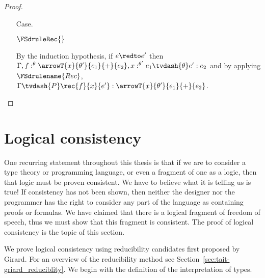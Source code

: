 \begin{proof}
\begin{itemize}
  \item[Case.]\ \\
    \begin{center}
      $\FSdruleRec{}$
    \end{center}
    By the induction hypothesis, if $e \redto e'$ then 
    $\Gamma, f:^\theta \arrowT{x}{\theta'}{e_1}{+}{e_2},x:^{\theta'} e_1 \tvdash{\theta} e':e_2$ 
    and by applying $\FSdrulename{Rec}$,
    $\Gamma \tvdash{P} \rec{f}{x}{e'}:\arrowT{x}{\theta'}{e_1}{+}{e_2}$.
  \end{itemize}
\end{proof}

\section{Logical consistency}
\label{sec:logical_consistency}

One recurring statement throughout this thesis is that if we are to
consider a type theory or programming language, or even a fragment of
one as a logic, then that logic must be proven consistent.  We have to
believe what it is telling us is true!  If consistency has not been
shown, then neither the designer nor the programmer has the right to
consider any part of the language as containing proofs or formulas.
We have claimed that there is a logical fragment of freedom of speech,
thus we must show that this fragment is consistent.  The proof of
logical consistency is the topic of this section.

We prove logical consistency using reducibility candidates first
proposed by Girard.  For an overview of the reducibility method see
Section~\ref{sec:tait-griard_reduciblity}.  We begin with the
definition of the interpretation of types.


